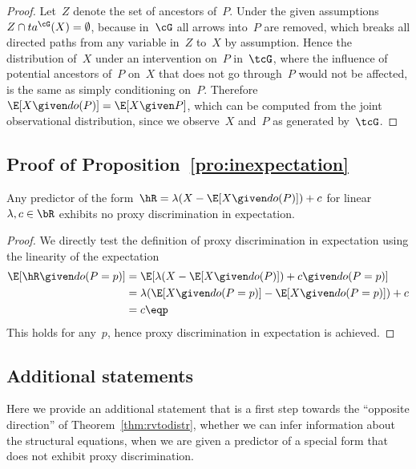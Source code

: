 \begin{proof}
  Let~$Z$ denote the set of ancestors of~$P$. Under the given assumptions~$Z
  \cap ta^{\cG} (X) = \emptyset$, because in~$\cG$ all arrows into~$P$ are
  removed, which breaks all directed paths from any variable in~$Z$ to~$X$ by
  assumption. Hence the distribution of~$X$ under an intervention on~$P$
  in~$\tcG$, where the influence of potential ancestors of~$P$ on~$X$ that
  does not go through~$P$ would not be affected, is the same as simply
  conditioning on~$P$. Therefore~$\E[X \given do(P)] = \E[X \given P]$, which
  can be computed from the joint observational distribution, since we
  observe~$X$ and~$P$ as generated by~$\tcG$.\qedhere
\end{proof}

\subsection*{Proof of Proposition~\ref{pro:inexpectation}}

\begin{proposition*}
  Any predictor of the form~$\hR = \lambda (X - \E[X \given do(P)]) + c$ for
  linear~$\lambda, c \in \bR$ exhibits no proxy discrimination in expectation.
\end{proposition*}

\begin{proof}
  We directly test the definition of proxy discrimination in expectation using
  the linearity of the expectation
  \begin{align*}
    \E[\hR \given do(P=p)] &= \E[\lambda (X - \E[X \given do(P)])
      + c \given do(P=p)] \\
    &= \lambda (\E[ X \given do(P=p)] - \E[X \given do(P=p)]) + c \\
    &= c \eqp
  \end{align*}
  This holds for any~$p$, hence proxy discrimination in expectation is
  achieved.\qedhere
\end{proof}

\subsection*{Additional statements}

Here we provide an additional statement that is a first step towards the
``opposite direction'' of Theorem~\ref{thm:rvtodistr}, \ie{} whether we can
infer information about the structural equations, when we are given a predictor
of a special form that does not exhibit proxy discrimination.

